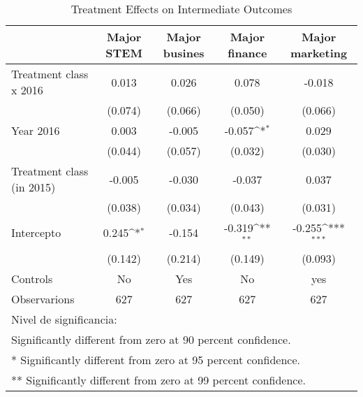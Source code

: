 \begin{table}[]
\caption{Treatment Effects on Intermediate Outcomes}
{
\def\sym#1{\ifmmode^{#1}\else\(^{#1}\)\fi}
\begin{tabular}{@{\extracolsep{2pt}}l*{4}{c}@{}}
\hline\hline


 & Major STEM & Major busines & Major finance & Major marketing \\
\hline
Treatment class x 2016 & 0.013 & 0.026 & 0.078 & -0.018 \\
 & (0.074) & (0.066) & (0.050) & (0.066) \\
Year 2016 & 0.003 & -0.005 & -0.057\sym{*} & 0.029 \\
 & (0.044) & (0.057) & (0.032) & (0.030) \\
Treatment class (in 2015) & -0.005 & -0.030 & -0.037 & 0.037 \\
 & (0.038) & (0.034) & (0.043) & (0.031) \\
Intercepto & 0.245\sym{*} & -0.154 & -0.319\sym{**} & -0.255\sym{***} \\
 & (0.142) & (0.214) & (0.149) & (0.093) \\
Controls & No & Yes & No & yes \\

\hline
Observarions & 627 & 627 & 627 & 627 \\
\hline\hline
\multicolumn{5}{l}{\footnotesize Nivel de significancia:}\vspace{-.25em} \\
\multicolumn{5}{l}{\footnotesize * Significantly different from zero at 90 percent confidence.}\vspace{-.25em} \\
\multicolumn{5}{l}{\footnotesize ** Significantly different from zero at 95 percent confidence.}\vspace{-.25em} \\
\multicolumn{5}{l}{\footnotesize *** Significantly different from zero at 99 percent confidence.}
\end{tabular}
}
\end{table}